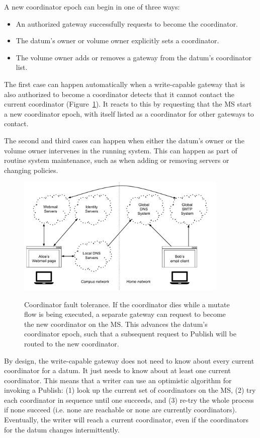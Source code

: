 A new coordinator epoch can begin in one of
three ways:

\begin{itemize}
   \item An authorized gateway successfully requests to become the coordinator.
   \item The datum's owner or volume owner explicitly sets a coordinator.
   \item The volume owner adds or removes a gateway from the datum's coordinator
      list.
\end{itemize}

The first case can happen automatically when a write-capable gateway that is
also authorized to become a coordinator detects that it cannot contact the
current coordinator (Figure~\ref{fig:chap2-coordinator-change}).  It reacts to this by requesting that the MS start
a new coordinator epoch, with itself listed as a coordinator for other gateways to contact.

The second and third cases can happen when either the datum's owner or the
volume owner intervenes in the running system.  This can happen as part of routine system
maintenance, such as when adding or removing servers or changing
policies.

\begin{figure}[h]
   \caption{Coordinator fault tolerance.  If the coordinator dies while a mutate
   flow is being executed, a separate gateway can request to become the new
   coordinator on the MS.  This advances the datum's coordinator epoch, such
   that a subsequent request to Publish will be routed to the new coordinator.}
   \centering
   \includegraphics[width=0.9\textwidth,page=11]{figures/dissertation-figures}
   \label{fig:chap2-coordinator-change}
\end{figure}

By design, the write-capable gateway does not need to know
about every current coordinator for a datum.  It just needs to know about
at least one current coordinator.  This means that a writer can use an
optimistic algorithm for invoking a Publish: 
(1) look up the current set of coordinators on the MS, (2) try each coordinator in
sequence until one succeeds, and (3) re-try the whole process if none
succeed (i.e. none are reachable or none are currently coordinators).
Eventually, the writer will reach a current coordinator, even if the
coordinators for the datum changes intermittently.

